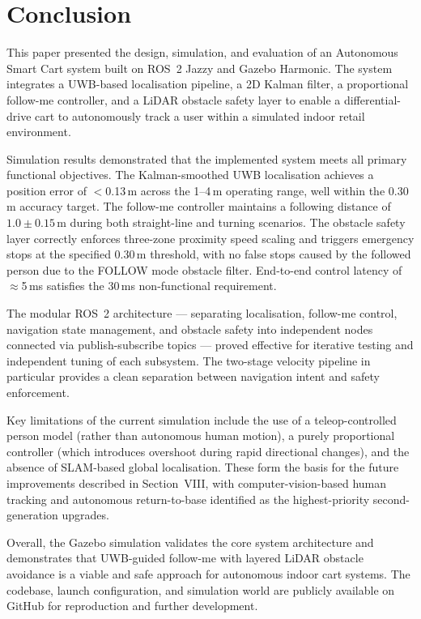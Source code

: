 \section{Conclusion}

This paper presented the design, simulation, and evaluation of an
Autonomous Smart Cart system built on ROS~2 Jazzy and Gazebo Harmonic.
The system integrates a UWB-based localisation pipeline, a 2D Kalman
filter, a proportional follow-me controller, and a LiDAR obstacle
safety layer to enable a differential-drive cart to autonomously track
a user within a simulated indoor retail environment.

Simulation results demonstrated that the implemented system meets all
primary functional objectives. The Kalman-smoothed UWB localisation
achieves a position error of $<$0.13\,m across the 1--4\,m operating
range, well within the 0.30\,m accuracy target. The follow-me controller
maintains a following distance of $1.0 \pm 0.15$\,m during both
straight-line and turning scenarios. The obstacle safety layer correctly
enforces three-zone proximity speed scaling and triggers emergency stops
at the specified 0.30\,m threshold, with no false stops caused by the
followed person due to the FOLLOW mode obstacle filter. End-to-end
control latency of $\approx$5\,ms satisfies the 30\,ms non-functional
requirement.

The modular ROS~2 architecture --- separating localisation, follow-me
control, navigation state management, and obstacle safety into
independent nodes connected via publish-subscribe topics --- proved
effective for iterative testing and independent tuning of each
subsystem. The two-stage velocity pipeline in particular provides a
clean separation between navigation intent and safety enforcement.

Key limitations of the current simulation include the use of a
teleop-controlled person model (rather than autonomous human motion),
a purely proportional controller (which introduces overshoot during
rapid directional changes), and the absence of SLAM-based global
localisation. These form the basis for the future improvements
described in Section~VIII, with computer-vision-based human tracking
and autonomous return-to-base identified as the highest-priority
second-generation upgrades.

Overall, the Gazebo simulation validates the core system architecture
and demonstrates that UWB-guided follow-me with layered LiDAR obstacle
avoidance is a viable and safe approach for autonomous indoor cart
systems. The codebase, launch configuration, and simulation world are
publicly available on GitHub for reproduction and further development.
